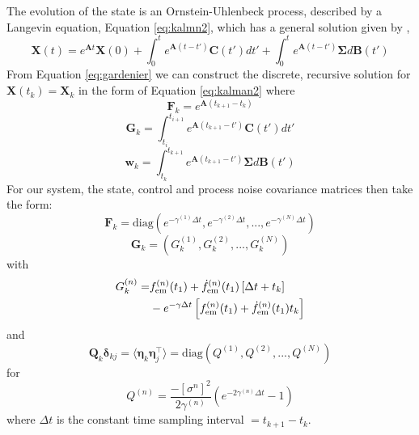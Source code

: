 \documentclass[fleqn,usenatbib,useAMS]{mnras}
\begin{document}
The evolution of the state is an Ornstein-Uhlenbeck process, described by a Langevin equation, Equation \eqref{eq:kalmn2}, which has a general solution given by \citep{gardiner2009stochastic},
\begin{equation}
	\boldsymbol{X}(t) = e^{\boldsymbol{A} t} \boldsymbol{X}(0) + \int_0^t e^{\boldsymbol{A}(t-t')} \boldsymbol{C}(t') dt' + \int_0^t e^{\boldsymbol{A}(t-t')} \boldsymbol{\Sigma} d\boldsymbol{B}(t') \label{eq:gardenier}
\end{equation} 
From Equation \eqref{eq:gardenier} we can construct the discrete, recursive solution for $\boldsymbol{X}(t_k) = \boldsymbol{X}_k$ in the form of Equation \eqref{eq:kalman2} where
\begin{equation}
\boldsymbol{F}_k = e^{\boldsymbol{A}\left( t_{k+1} - t_k \right)} 
\end{equation}
\begin{equation}
	\boldsymbol{G}_k = \int_{t_i}^{t_{i+1}}  e^{\boldsymbol{A}\left( t_{k+1} - t' \right)}  \boldsymbol{C}(t') dt' 
\end{equation}
\begin{equation}
	\boldsymbol{w}_k = \int_{t_k}^{t_{k+1}} e^{\boldsymbol{A}\left( t_{k+1} - t' \right)} \boldsymbol{\Sigma} d \boldsymbol{B}(t')
	\end{equation}
For our system, the state, control and process noise covariance matrices then take the form:
\begin{equation}
	\boldsymbol{F}_k = 	\text{diag}\left(e^{- \gamma^{(1)} \Delta t},e^{- \gamma^{(2)} \Delta t},...,e^{- \gamma^{(N)} \Delta t} \right)
\end{equation}
\begin{equation}
\boldsymbol{G}_k	= \left(G^{(1)}_k, G^{(2)}_k,...,G^{(N)}_k \right)
\end{equation}
with
\begin{align}
	G_k^{(n)} =&    f^{(n)}_{\rm em}(t_1) + \dot{f}^{(n)}_{\rm em}(t_1)  \left[\Delta t + t_k \right] \nonumber \\ 
	&- e^{-\gamma \Delta t} \left[  f^{(n)}_{\rm em}(t_1) +\dot{f}^{(n)}_{\rm em}(t_1)  t_k \right]
\end{align}
and
\begin{equation}
	\boldsymbol{Q}_k \boldsymbol{\delta}_{kj}= \langle \boldsymbol{\eta}_k \boldsymbol{\eta}_j^\intercal \rangle = \text{diag} \left(Q^{(1)}, Q^{(2)},...,Q^{(N)}\right) 
\end{equation}
for 
\begin{equation}
	Q^{(n)} = \frac{- [\sigma^{n}]^2}{2 \gamma^{(n)}} \left( e^{-2 \gamma^{(n)} \Delta t} -1\right)
\end{equation}
where $\Delta t$ is the constant time sampling interval $=t_{k+1} -t_{k}$. \newline 
\end{document}
